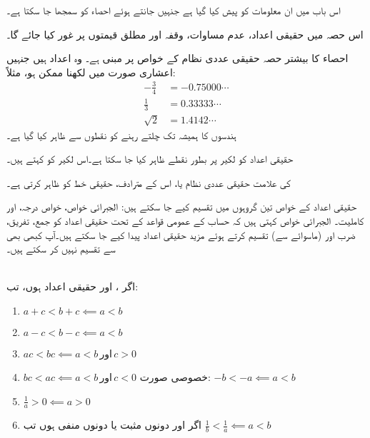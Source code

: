 اس باب میں ان معلومات کو پیش کیا گیا ہے جنہیں جانتے ہوئے احصاء کو سمجھا جا سکتا ہے۔

اس حصہ میں حقیقی اعداد، عدم مساوات، وقفہ اور مطلق قیمتوں پر غور کیا جائے گا۔

احصاء کا بیشتر حصہ حقیقی عددی نظام کے خواص پر مبنی ہے۔ وہ اعداد ہیں جنہیں اعشاری صورت میں لکھنا ممکن ہو، مثلاً:
\begin{align*}
-\frac{3}{4}&=-0.75000\cdots\\
\frac{1}{3}&=0.33333\cdots\\
\sqrt{2}&=1.4142\cdots
\end{align*}
ہندسوں کا  ہمیشہ تک چلتے رہنے کو نقطوں  سے ظاہر کیا گیا ہے۔

حقیقی اعداد کو لکیر پر بطور نقطے ظاہر کیا جا سکتا ہے۔اس لکیر کو  کہتے ہیں۔
\begin{center}
\end{center}
 کی علامت حقیقی عددی نظام یا، اس کے مترادف، حقیقی خط کو ظاہر کرتی ہے۔

حقیقی اعداد کے خواص تین گروہوں میں تقسیم کیے جا سکتے ہیں: الجبرائی خواص، خواص درجہ، اور کاملیت۔ الجبرائی خواص کہتی ہیں کہ حساب کے عمومی قواعد کے تحت حقیقی اعداد کو جمع، تفریق، ضرب اور (ماسوائے  سے) تقسیم   کرتے ہوئے مزید حقیقی اعداد پیدا کیے جا سکتے ہیں۔آپ کبھی بھی  سے تقسیم نہیں کر سکتے ہیں۔

\\
اگر ،  اور  حقیقی اعداد ہوں، تب:
\begin{enumerate}[1.]
\item
$a+c<b+c\impliedby a<b$
\item
$a-c<b-c\impliedby a<b$
\item
$ac<bc\impliedby a<b \,\text{اور}\, c>0$
\item
$bc<ac\impliedby a<b\, \text{اور}\, c<0$\quad 
خصوصی صورت:
$-b<-a\impliedby a<b$
\item
$\frac{1}{a}>0\impliedby a>0$
\item
اگر  اور  دونوں مثبت یا دونوں منفی ہوں تب 
$\frac{1}{b}<\frac{1}{a}\impliedby a<b$
\end{enumerate}

